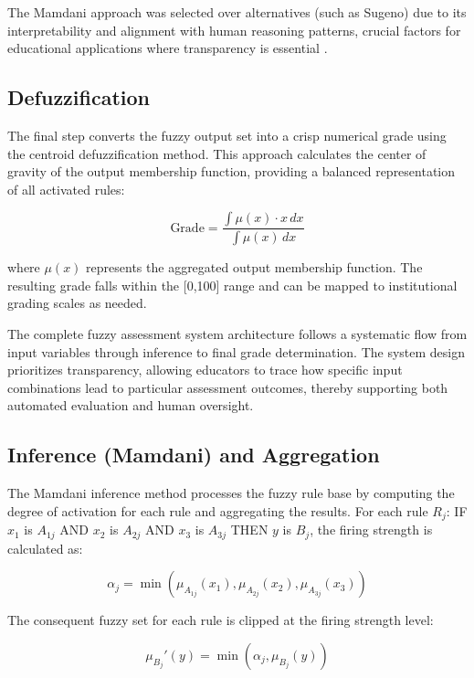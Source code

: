 The Mamdani approach was selected over alternatives (such as Sugeno) due to its interpretability and alignment with human reasoning patterns, crucial factors for educational applications where transparency is essential \cite{Johnson2023}.

\subsection{Defuzzification}

The final step converts the fuzzy output set into a crisp numerical grade using the centroid defuzzification method. This approach calculates the center of gravity of the output membership function, providing a balanced representation of all activated rules:

\begin{equation}
\text{Grade} = \frac{\int \mu(x) \cdot x \, dx}{\int \mu(x) \, dx}
\end{equation}

where $\mu(x)$ represents the aggregated output membership function. The resulting grade falls within the [0,100] range and can be mapped to institutional grading scales as needed.

The complete fuzzy assessment system architecture follows a systematic flow from input variables through inference to final grade determination. The system design prioritizes transparency, allowing educators to trace how specific input combinations lead to particular assessment outcomes, thereby supporting both automated evaluation and human oversight.

\subsection{Inference (Mamdani) and Aggregation}

The Mamdani inference method processes the fuzzy rule base by computing the degree of activation for each rule and aggregating the results. For each rule $R_j$: IF $x_1$ is $A_{1j}$ AND $x_2$ is $A_{2j}$ AND $x_3$ is $A_{3j}$ THEN $y$ is $B_j$, the firing strength is calculated as:

\begin{equation}
\alpha_j = \min(\mu_{A_{1j}}(x_1), \mu_{A_{2j}}(x_2), \mu_{A_{3j}}(x_3))
\end{equation}

The consequent fuzzy set for each rule is clipped at the firing strength level:

\begin{equation}
\mu_{B_j}'(y) = \min(\alpha_j, \mu_{B_j}(y))
\end{equation}

